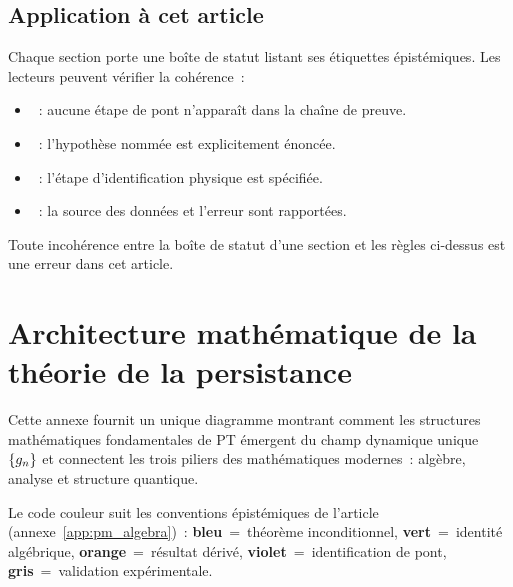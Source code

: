 \documentclass[12pt,a4paper]{article}
\begin{document}
\subsection{Application à cet article}
\label{sec:app_d_application}

Chaque section porte une boîte de statut listant ses étiquettes
épistémiques. Les lecteurs peuvent vérifier la cohérence~:
\begin{itemize}[nosep]
\item \THMTAG~: aucune étape de pont n'apparaît dans la chaîne de
  preuve.
\item \CONDTAG~: l'hypothèse nommée est explicitement énoncée.
\item \BRIDGETAG~: l'étape d'identification physique est
  spécifiée.
\item \VALTAG~: la source des données et l'erreur sont rapportées.
\end{itemize}

Toute incohérence entre la boîte de statut d'une section et les
règles ci-dessus est une erreur dans cet article.


\newpage

\section{Architecture mathématique de la théorie de la persistance}
\label{app:architecture}

Cette annexe fournit un unique diagramme montrant comment les
structures mathématiques fondamentales de PT émergent du champ
dynamique unique~$\{g_n\}$ et connectent les trois piliers des
mathématiques modernes~: algèbre, analyse et structure quantique.

Le code couleur suit les conventions épistémiques de l'article
(annexe~\ref{app:pm_algebra})~:
\textcolor{thmblue}{\textbf{bleu}}~=~théorème inconditionnel,
\textcolor{idgreen}{\textbf{vert}}~=~identité algébrique,
\textcolor{derorange}{\textbf{orange}}~=~résultat dérivé,
\textcolor{bridgepurple}{\textbf{violet}}~=~identification de pont,
\textcolor{valgray}{\textbf{gris}}~=~validation expérimentale.
\end{document}
